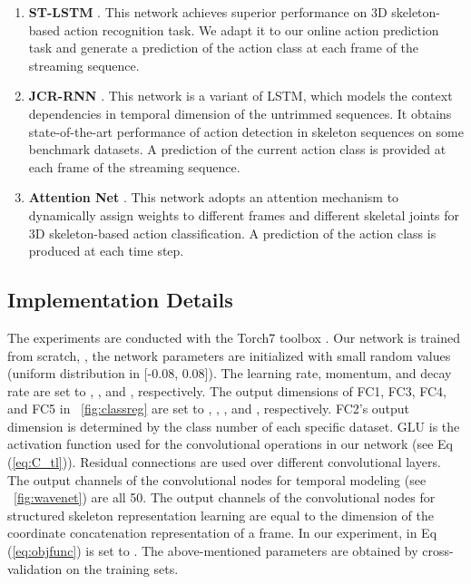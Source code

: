 \documentclass[10pt,twocolumn,letterpaper]{article}
\begin{document}
\begin{enumerate}
  \item
\textbf{ST-LSTM} \cite{liu2017PAMI}.
This network achieves superior performance on 3D skeleton-based action recognition task.
We adapt it to our online action prediction task and generate a prediction of the action class at each frame of the streaming sequence.
\item
\textbf{JCR-RNN} \cite{li2016online}.
This network is a variant of LSTM, which models the context dependencies in temporal dimension of the untrimmed sequences. It obtains state-of-the-art performance of action detection in skeleton sequences on some benchmark datasets.
A prediction of the current action class is provided at each frame of the streaming sequence.
  \item
\textbf{Attention Net} \cite{liu2017global}.
This network adopts an attention mechanism to dynamically assign weights to different frames and different skeletal joints for 3D skeleton-based action classification.
A prediction of the action class is produced at each time step.
\end{enumerate}














\subsection{Implementation Details}








The experiments are conducted with the Torch7 toolbox \cite{collobert2011torch7}.
Our network is trained from scratch,
\ie, the network parameters are initialized with small random values (uniform distribution in [-0.08, 0.08]).
The learning rate, momentum, and decay rate are set to , , and , respectively.
The output dimensions of FC1, FC3, FC4, and FC5 in \figurename{~\ref{fig:classreg}} are set to , , , and , respectively.
FC2's output dimension is determined by the class number of each specific dataset.
GLU \cite{dauphin2016language} is the activation function used for the convolutional operations in our network (see Eq (\ref{eq:C_tl})).
Residual connections \cite{he2016deep} are used over different convolutional layers.
The output channels of the convolutional nodes for temporal modeling (see \figurename{~\ref{fig:wavenet}}) are all 50.
The output channels of the convolutional nodes for structured skeleton representation learning are equal to the dimension of the coordinate concatenation representation of a frame.
In our experiment,  in Eq (\ref{eq:objfunc}) is set to .
The above-mentioned parameters are obtained by cross-validation on the training sets.
\end{document}
